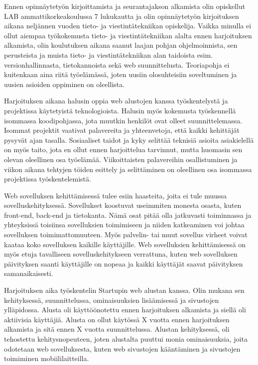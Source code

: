 \documentclass[11pt,a4paper,titlepage,oneside]{article}
\begin{document}
Ennen opinnäytetyön kirjoittamista ja seurantajakson alkamista olin opiskellut LAB ammattikorkeakoulussa 7 lukukautta ja
olin opinnäytetyön kirjoituksen aikana neljännen vuoden tieto- ja viestintätekniikan opiskelija.
Vaikka minulla ei ollut aiempaa työkokemusta tieto- ja viestintätekniikan alalta ennen harjoituksen alkamista,
olin koulutuksen aikana saanut laajan pohjan ohjelmoinnista,
sen perusteista ja muista tieto- ja viestintätekniikan alan taidoista esim. versionhallinnasta, tietokannoista sekä web suunnittelusta.
Teoriapohja ei kuitenkaan aina riitä työelämässä, joten uusiin olosuhteisiin soveltuminen ja uusien asioiden oppiminen on oleellista.
\medskip



Harjoituksen aikana halusin oppia web alustojen kanssa työskentelystä ja projektissa käytetyistä teknologioista.
Halusin myös kokemusta työskennellä isommassa koodipohjassa, jota muutkin henkilöt ovat olleet suunnittelemassa.
Isommat projektit vaativat palavereita ja yhteenvetoja, että kaikki kehittäjät pysyvät ajan tasalla.
Sosiaaliset taidot ja kyky selittää teknisiä asioita asiakielellä on myös taito, 
jota en ollut ennen harjoittelua tarvinnut, mutta huomasin sen olevan oleellinen osa työelämää.
Viikoittaisten palavereihin osallistuminen ja viikon aikana tehtyjen töiden esittely ja selittäminen on oleellinen osa isommassa projektissa työskentelemistä.
\medskip


Web sovelluksen kehittämisessä tulee esiin haasteita, joita ei tule muussa sovelluskehityksessä.
Sovellukset koostuvat useimmiten monesta osasta, kuten front-end, back-end ja tietokanta.
Nämä osat pitää olla jatkuvasti toiminnassa ja yhteyksissä toisiinsa sovelluksien toimimiseen ja niiden katkeaminen voi
johtaa sovelluksen toimimattomuuteen.
Myös palvelin- tai muut sovellus virheet voivat kaataa koko sovelluksen kaikille käyttäjille. 
Web sovelluksien kehittämisessä on myös etuja tavalliseen sovelluskehitykseen verrattuna, kuten 
web sovelluksen päivityksen saanti käyttäjille on nopeaa ja kaikki käyttäjät saavat päivityksen samanaikaisesti.
\medskip

Harjoituksen aika työskentelin Startupin web alustan kanssa. 
Olin mukana sen kehityksessä, suunnittelussa, ominaisuuksien lisäämisessä ja sivustojen ylläpidossa.
Alusta oli käyttöönotettu ennen harjoituksen alkamista ja siellä oli aktiivisia käyttäjiä.
Alusta on ollut käytössä X vuotta ennen harjoituksen alkamista ja sitä ennen X vuotta suunnittelussa.
Alustan kehityksessä, oli tehostettu kehitysnopeuteen,
joten alustalta puuttui monia ominaisuuksia, joita odotetaan web sovelluksesta, 
kuten web sivustojen kääntäminen ja sivustojen toimiminen mobiililaitteilla.
\medskip
\end{document}
